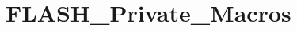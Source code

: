 \hypertarget{group___f_l_a_s_h___private___macros}{\section{F\-L\-A\-S\-H\-\_\-\-Private\-\_\-\-Macros}
\label{group___f_l_a_s_h___private___macros}
}
